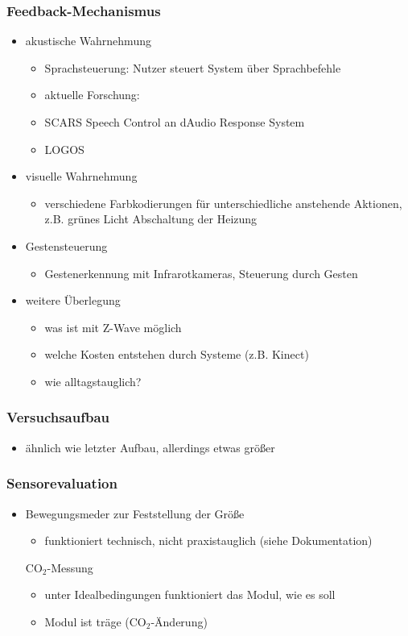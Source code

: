 \subsubsection{Feedback-Mechanismus}
\begin{itemize}
	\item akustische Wahrnehmung
	\begin{itemize}
		\item Sprachsteuerung: Nutzer steuert System über Sprachbefehle
		\item aktuelle Forschung:
		\item SCARS Speech Control an dAudio Response System
		\item LOGOS
	\end{itemize}
	\item visuelle Wahrnehmung
	\begin{itemize}
		\item verschiedene Farbkodierungen für unterschiedliche anstehende Aktionen, z.B. grünes Licht \textrightarrow{ }Abschaltung der Heizung
	\end{itemize}
	\item Gestensteuerung
	\begin{itemize}
		\item Gestenerkennung mit Infrarotkameras, Steuerung durch Gesten
	\end{itemize}
	\item weitere Überlegung
	\begin{itemize}
		\item was ist mit Z-Wave möglich
		\item welche Kosten entstehen durch Systeme (z.B. Kinect)
		\item wie alltagstauglich?
	\end{itemize}
\end{itemize}

\subsubsection{Versuchsaufbau}
\begin{itemize}
	\item ähnlich wie letzter Aufbau, allerdings etwas größer
\end{itemize}

\subsubsection{Sensorevaluation}
\begin{itemize}
	\item Bewegungsmeder zur Feststellung der Größe
	\begin{itemize}
		\item funktioniert technisch, nicht praxistauglich (siehe Dokumentation)
	\end{itemize}CO$_2$-Messung
	\begin{itemize}
		\item unter Idealbedingungen funktioniert das Modul, wie es soll
		\item Modul ist träge (\textrightarrow{ }CO$_2$-Änderung)
	\end{itemize}
\end{itemize}

